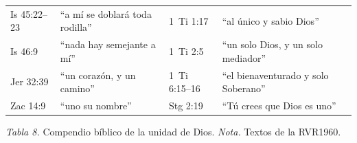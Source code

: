 \begin{center}
\begin{tabular}{@{}L{2.2cm}L{5.0cm}|L{2.2cm}L{5.0cm}@{}}
Is 45:22--23 & ``a mí se doblará toda rodilla'' & 1~Ti 1:17 & ``al único y sabio Dios'' \\
Is 46:9 & ``nada hay semejante a mí'' & 1~Ti 2:5 & ``un solo Dios, y un solo mediador'' \\
Jer 32:39 & ``un corazón, y un camino'' & 1~Ti 6:15--16 & ``el bienaventurado y solo Soberano'' \\
Zac 14:9 & ``uno su nombre'' & Stg 2:19 & ``Tú crees que Dios es uno'' \\
\bottomrule
\end{tabular}\par
{\footnotesize\color{gris}\textit{Tabla 8.} Compendio bíblico de la unidad de Dios. \textit{Nota.} Textos de la RVR1960.}
\end{center}

